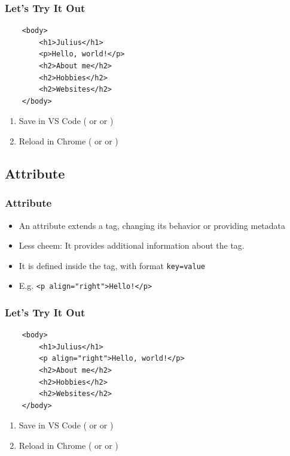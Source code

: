 \documentclass[12pt]{beamer}
\begin{document}
\begin{frame}[fragile]
\frametitle{Let's Try It Out}
\begin{verbatim}
	<body>
		<h1>Julius</h1>
		<p>Hello, world!</p>
		<h2>About me</h2>
		<h2>Hobbies</h2>
		<h2>Websites</h2>
	</body>
\end{verbatim}
\begin{enumerate}
	\item Save in VS Code ( or  or )
	\item Reload in Chrome ( or  or )
\end{enumerate}
\end{frame}

\subsection{Attribute}

\begin{frame}[fragile]
\frametitle{Attribute}
\begin{itemize}
	\item An attribute extends a tag, changing its behavior or providing metadata\footnotemark
	\item Less cheem: It provides additional information about the tag.
	\item It is defined inside the tag, with format \texttt{key=value}
	\item E.g. \texttt{<p align="right">Hello!</p>}
\end{itemize}
\end{frame}

\begin{frame}[fragile]
\frametitle{Let's Try It Out}
\begin{verbatim}
	<body>
		<h1>Julius</h1>
		<p align="right">Hello, world!</p>
		<h2>About me</h2>
		<h2>Hobbies</h2>
		<h2>Websites</h2>
	</body>
\end{verbatim}
\begin{enumerate}
	\item Save in VS Code ( or  or )
	\item Reload in Chrome ( or  or )
\end{enumerate}
\end{frame}
\end{document}
